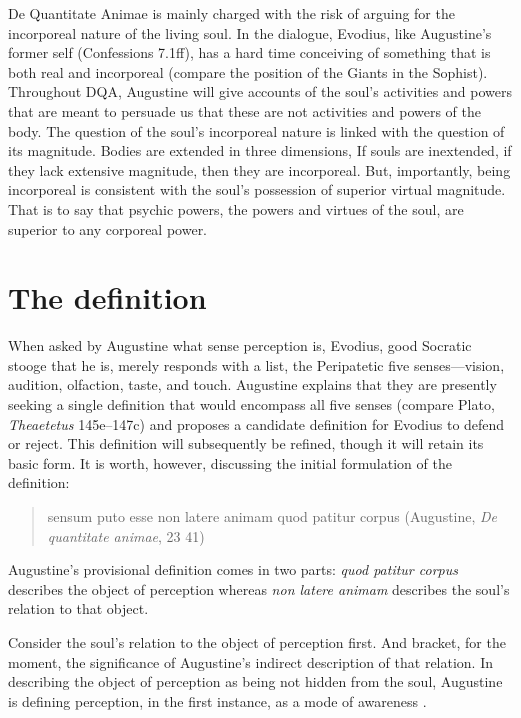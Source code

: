 \documentclass[12pt]{article}
\begin{document}
De Quantitate Animae  is mainly charged with the risk of arguing for the incorporeal nature of the living soul. In the dialogue, Evodius, like Augustine’s former self (Confessions 7.1ff), has a hard time conceiving of something that is both real and incorporeal (compare the position of the Giants in the Sophist). Throughout DQA, Augustine will give accounts of the soul’s activities and powers that are meant to persuade us that these are not activities and powers of the body. The question of the soul’s incorporeal nature is linked with the question of its magnitude. Bodies are extended in three dimensions, If souls are inextended, if they lack extensive magnitude, then they are incorporeal. But, importantly, being incorporeal is consistent with the soul’s possession of superior virtual magnitude. That is to say that psychic powers, the powers and virtues of the soul, are superior to any corporeal power. 


\section{The definition} %
\label{sec:the_definition}

When asked by Augustine what sense perception is, Evodius, good Socratic stooge that he is, merely responds with a list, the Peripatetic five senses---vision, audition, olfaction, taste, and touch. Augustine explains that they are presently seeking a single definition that would encompass all five senses (compare Plato, \emph{Theaetetus} 145e--147c) and proposes a candidate definition for Evodius to defend or reject. This definition will subsequently be refined, though it will retain its basic form. It is worth, however, discussing the initial formulation of the definition: 
\begin{quote}
	sensum puto esse non latere animam quod patitur corpus (Augustine, \emph{De quantitate animae}, 23 41)
\end{quote}
Augustine's provisional definition comes in two parts: \emph{quod patitur corpus} describes the object of perception whereas \emph{non latere animam} describes the soul's relation to that object. 

Consider the soul's relation to the object of perception first. And bracket, for the moment, the significance of Augustine's indirect description of that relation. In describing the object of perception as being not hidden from the soul, Augustine is defining perception, in the first instance, as a mode of awareness \citep[275]{Brittain:2002hl}. 
\end{document}
